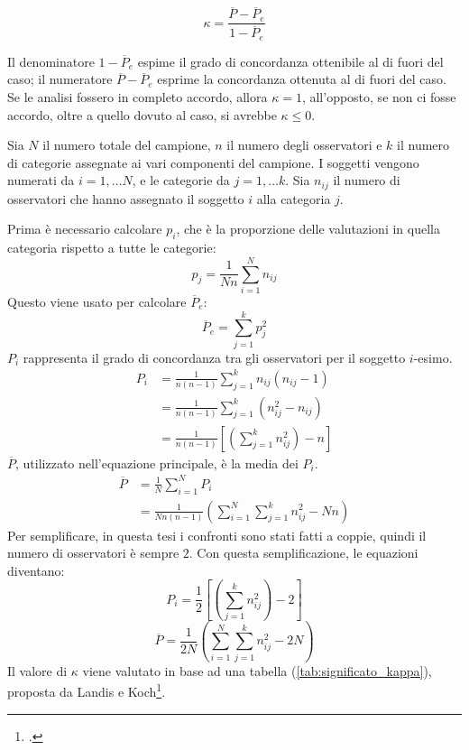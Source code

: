 \begin{equation}
\label{eq:kappa_fleiss}
\kappa = \frac{\overline{P} - \overline{P}_e}{1 - \overline{P}_e}
\end{equation}

Il denominatore $1 - \overline{P}_e$ espime il grado di concordanza ottenibile al di fuori del caso; il numeratore $\overline{P} - \overline{P}_e$ esprime la concordanza ottenuta al di fuori del caso. Se le analisi fossero in completo accordo, allora $\kappa = 1$, all'opposto, se non ci fosse accordo, oltre a quello dovuto al caso, si avrebbe $\kappa \leq 0$.

Sia $N$ il numero totale del campione, $n$ il numero degli osservatori e $k$ il numero di categorie assegnate ai vari componenti del campione. I soggetti vengono numerati da $i = 1, \ldots N$, e le categorie da $j = 1, \ldots k$. Sia $n_{ij}$ il numero di osservatori che hanno assegnato il soggetto $i$ alla categoria $j$.

Prima è necessario calcolare $p_i$, che è la proporzione delle valutazioni in quella categoria rispetto a tutte le categorie:
\begin{equation*}
p_j = \frac{1}{Nn}\sum_{i=1}^N n_{ij}
\end{equation*}
Questo viene usato per calcolare $\overline{P}_e$:
\begin{equation}
\overline{P}_e = \sum_{j=1}^k p^2_j
\end{equation}
$P_i$ rappresenta il grado di concordanza tra gli osservatori per il soggetto $i$-esimo.
\begin{align*}
P_i &= \frac{1}{n(n-1)}\sum_{j=1}^k n_{ij}(n_{ij}-1) \\
&= \frac{1}{n(n-1)}\sum_{j=1}^k (n^2_{ij}-n_{ij}) \\
&= \frac{1}{n(n-1)}[(\sum_{j=1}^k n^2_{ij}) - n]
\end{align*}
$\overline{P}$, utilizzato nell'equazione principale, è la media dei $P_i$.
\begin{align*}
\overline{P} &= \frac{1}{N}\sum_{i=1}^N P_i \\
&= \frac{1}{Nn(n-1)}(\sum_{i=1}^N\sum_{j=1}^k n^2_{ij} - Nn)
\end{align*}
Per semplificare, in questa tesi i confronti sono stati fatti a coppie, quindi il numero di osservatori è sempre $2$. Con questa semplificazione, le equazioni diventano:
\begin{equation}
P_i = \frac{1}{2}[(\sum_{j=1}^k n^2_{ij}) - 2]
\end{equation}
\begin{equation}
\overline{P} = \frac{1}{2N}(\sum_{i=1}^N\sum_{j=1}^k n^2_{ij} - 2N)
\end{equation}
Il valore di $\kappa$ viene valutato in base ad una tabella (\vref*{tab:significato_kappa}), proposta da Landis e Koch\footcite{Landis1977}.

